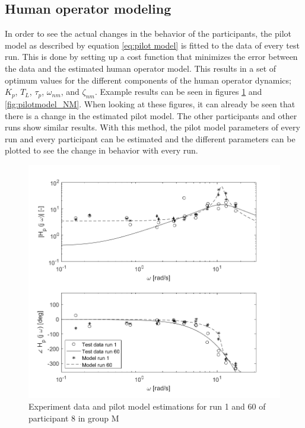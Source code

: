 \documentclass[conference]{IEEEtran}
\begin{document}
\subsection{Human operator modeling}
In order to see the actual changes in the behavior of the participants, the pilot model as described by equation \ref{eq:pilot model} is fitted to the data of every test run. This is done by setting up a cost function that minimizes the error between the data and the estimated human operator model. This results in a set of optimum values for the different components of the human operator dynamics; $K_p$, $T_L$, $\tau_p$, $\omega_{nm}$, and $\zeta_{nm}$. Example results can be seen in figures \ref{fig:pilotmodel_M} and \ref{fig:pilotmodel_NM}. When looking at these figures, it can already be seen that there is a change in the estimated pilot model. The other participants and other runs show similar results. With this method, the pilot model parameters of every run and every participant can be estimated and the different parameters can be plotted to see the change in behavior with every run. \\

\begin{figure}[h!]
    \centering
    \includegraphics[width=\linewidth]{images/run1_60_participant1M.png}
    \caption{Experiment data and pilot model estimations for run 1 and 60 of participant 8 in group M}
    \label{fig:pilotmodel_M}
\end{figure}
\end{document}

